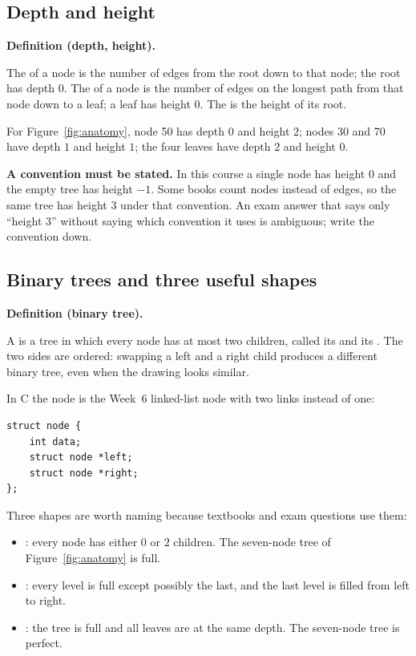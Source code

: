 \documentclass[11pt]{article}
\theoremstyle{definition}
\newenvironment{definitionbox}[1]{%
  \par\noindent\textbf{Definition (#1).}\ \itshape
}{\par\vspace{0.3em}}
\begin{document}
\subsection{Depth and height}

\begin{definitionbox}{depth, height}
The  of a node is the number of edges from the root down to that
node; the root has depth $0$. The  of a node is the number of
edges on the longest path from that node down to a leaf; a leaf has height
$0$. The  is the height of its root.
\end{definitionbox}

For Figure~\ref{fig:anatomy}, node 50 has depth $0$ and height $2$; nodes 30
and 70 have depth $1$ and height $1$; the four leaves have depth $2$ and
height $0$.

\textbf{A convention must be stated.} In this course a single node has height
$0$ and the empty tree has height $-1$. Some books count nodes instead of
edges, so the same tree has height $3$ under that convention. An exam answer
that says only ``height 3'' without saying which convention it uses is
ambiguous; write the convention down.

\subsection{Binary trees and three useful shapes}

\begin{definitionbox}{binary tree}
A  is a tree in which every node has at most two children,
called its  and its . The two sides are
ordered: swapping a left and a right child produces a different binary tree,
even when the drawing looks similar.
\end{definitionbox}

In C the node is the Week~6 linked-list node with two links instead of one:

\begin{verbatim}
struct node {
    int data;
    struct node *left;
    struct node *right;
};
\end{verbatim}

Three shapes are worth naming because textbooks and exam questions use them:

\begin{itemize}
  \item {}: every node has either $0$ or $2$ children. The seven-node
    tree of Figure~\ref{fig:anatomy} is full.
  \item {}: every level is full except possibly the last, and the
    last level is filled from left to right.
  \item {}: the tree is full and all leaves are at the same depth.
    The seven-node tree is perfect.
\end{itemize}
\end{document}
